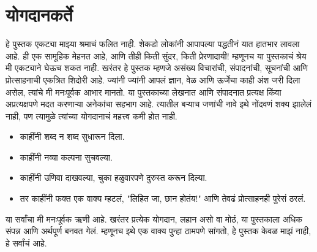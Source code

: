  \chapter{योगदानकर्ते}
हे पुस्तक एकट्या माझ्या श्रमाचं फलित नाही. शेकडो लोकांनी आपापल्या पद्धतीनं यात हातभार लावला आहे. ही एक सामूहिक मेहनत आहे, आणि तीही किती सुंदर, किती प्रेरणादायी!
म्हणूनच या पुस्तकाचं श्रेय मी एकट्याने घेऊच शकत नाही. खरंतर हे पुस्तक म्हणजे असंख्य विचारांची, संपादनांची, सूचनांची आणि प्रोत्साहनाची एकत्रित शिदोरी आहे. ज्यांनी ज्यांनी आपलं ज्ञान, वेळ आणि ऊर्जेचा काही अंश जरी दिला असेल, त्यांचे मी मनःपूर्वक आभार मानतो.
या पुस्तकाच्या लेखनात आणि संपादनात प्रत्यक्ष किंवा अप्रत्यक्षपणे मदत करणाऱ्या अनेकांचा सहभाग आहे. त्यातील बऱ्याच जणांची नावे इथे नोंदवणं शक्य झालेलं नाही, पण त्यामुळे त्यांच्या योगदानाचं महत्त्व कमी होत नाही.
\begin{itemize}
 \item काहींनी शब्द न शब्द सुधारून दिला.
 \item काहींनी नव्या कल्पना सुचवल्या.
 \item काहींनी उणिवा दाखवल्या, चुका हळुवारपणे दुरुस्त करून दिल्या.
 \item तर काहींनी फक्त एक वाक्य म्हटलं,  "लिहित जा, छान होतंय!" आणि तेवढं प्रोत्साहनही पुरेसं ठरलं.
 \end{itemize}
या सर्वांचा मी मनःपूर्वक ऋणी आहे. खरंतर प्रत्येक योगदान, लहान असो वा मोठं, या पुस्तकाला अधिक संपन्न आणि अर्थपूर्ण बनवत गेलं.
म्हणूनच इथे एक वाक्य पुन्हा ठामपणे सांगतो,  हे पुस्तक केवळ माझं नाही, हे सर्वांचं आहे.

